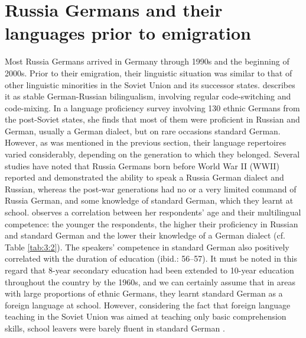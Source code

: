 \section{Russia Germans and their languages prior to emigration}{\label{ru-de}}
Most Russia Germans arrived in Germany through 1990s and the beginning of 2000s. Prior to their emigration, their linguistic situation was similar to that of other linguistic minorities in the Soviet Union and its successor states. \citet[][3]{berend98} describes it as stable German-Russian bilingualism, involving regular code-switching and code-mixing. In a language proficiency survey involving 130 ethnic Germans from the post-Soviet states, she finds that most of them were proficient in Russian and German, usually a German dialect, but on rare occasions standard German. However, as was mentioned in the previous section, their language repertoires varied considerably, depending on the generation to which they belonged. Several studies \citep[e.g.,][]{dietz-hilkes1993, berend98, meng01, riehlTA} have noted that Russia Germans born before World War II (WWII) reported and demonstrated the ability to speak a Russia German dialect and Russian, whereas the post-war generations had no or a very limited command of Russia German, and some knowledge of standard German, which they learnt at school. \citet[][55]{berend98} observes a correlation between her respondents' age and their multilingual competence: the younger the respondents, the higher their proficiency in Russian and standard German and the lower their knowledge of a German dialect (cf. Table \ref{tab:3:2}). The speakers' competence in standard German also positively correlated with the duration of education (ibid.: 56--57). It must be noted in this regard that 8-year secondary education had been extended to 10-year education throughout the country by the 1960s, and we can certainly assume that in areas with large proportions of ethnic Germans, they learnt standard German as a foreign language at school. However, considering the fact that foreign language teaching in the Soviet Union was aimed at teaching only basic comprehension skills, school leavers were barely fluent in standard German \citep[cf.][309]{ivanovaitivyaeva}.

